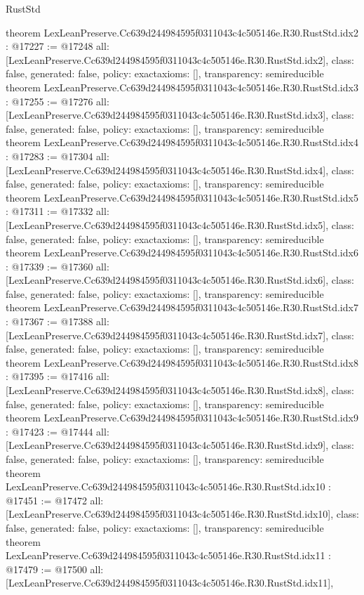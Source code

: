 \begin{lexlean}{RustStd}
\begin{coremodule}
{}
theorem LexLeanPreserve.Cc639d244984595f0311043c4c505146e.R30.RustStd.idx2 : @17227 := @17248 {
  all: [LexLeanPreserve.Cc639d244984595f0311043c4c505146e.R30.RustStd.idx2],
  class: false,
  generated: false,
  policy: exact{axioms: []},
  transparency: semireducible
}
theorem LexLeanPreserve.Cc639d244984595f0311043c4c505146e.R30.RustStd.idx3 : @17255 := @17276 {
  all: [LexLeanPreserve.Cc639d244984595f0311043c4c505146e.R30.RustStd.idx3],
  class: false,
  generated: false,
  policy: exact{axioms: []},
  transparency: semireducible
}
theorem LexLeanPreserve.Cc639d244984595f0311043c4c505146e.R30.RustStd.idx4 : @17283 := @17304 {
  all: [LexLeanPreserve.Cc639d244984595f0311043c4c505146e.R30.RustStd.idx4],
  class: false,
  generated: false,
  policy: exact{axioms: []},
  transparency: semireducible
}
theorem LexLeanPreserve.Cc639d244984595f0311043c4c505146e.R30.RustStd.idx5 : @17311 := @17332 {
  all: [LexLeanPreserve.Cc639d244984595f0311043c4c505146e.R30.RustStd.idx5],
  class: false,
  generated: false,
  policy: exact{axioms: []},
  transparency: semireducible
}
theorem LexLeanPreserve.Cc639d244984595f0311043c4c505146e.R30.RustStd.idx6 : @17339 := @17360 {
  all: [LexLeanPreserve.Cc639d244984595f0311043c4c505146e.R30.RustStd.idx6],
  class: false,
  generated: false,
  policy: exact{axioms: []},
  transparency: semireducible
}
theorem LexLeanPreserve.Cc639d244984595f0311043c4c505146e.R30.RustStd.idx7 : @17367 := @17388 {
  all: [LexLeanPreserve.Cc639d244984595f0311043c4c505146e.R30.RustStd.idx7],
  class: false,
  generated: false,
  policy: exact{axioms: []},
  transparency: semireducible
}
theorem LexLeanPreserve.Cc639d244984595f0311043c4c505146e.R30.RustStd.idx8 : @17395 := @17416 {
  all: [LexLeanPreserve.Cc639d244984595f0311043c4c505146e.R30.RustStd.idx8],
  class: false,
  generated: false,
  policy: exact{axioms: []},
  transparency: semireducible
}
theorem LexLeanPreserve.Cc639d244984595f0311043c4c505146e.R30.RustStd.idx9 : @17423 := @17444 {
  all: [LexLeanPreserve.Cc639d244984595f0311043c4c505146e.R30.RustStd.idx9],
  class: false,
  generated: false,
  policy: exact{axioms: []},
  transparency: semireducible
}
theorem LexLeanPreserve.Cc639d244984595f0311043c4c505146e.R30.RustStd.idx10 : @17451 := @17472 {
  all: [LexLeanPreserve.Cc639d244984595f0311043c4c505146e.R30.RustStd.idx10],
  class: false,
  generated: false,
  policy: exact{axioms: []},
  transparency: semireducible
}
theorem LexLeanPreserve.Cc639d244984595f0311043c4c505146e.R30.RustStd.idx11 : @17479 := @17500 {
  all: [LexLeanPreserve.Cc639d244984595f0311043c4c505146e.R30.RustStd.idx11],
}
\end{coremodule}
\end{lexlean}

